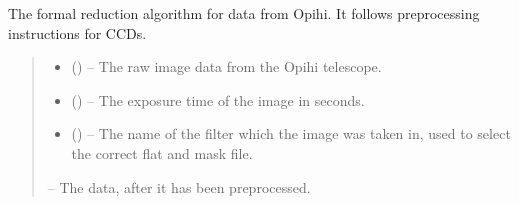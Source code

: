 \documentclass[letterpaper,11pt,english]{sphinxmanual}
\begin{document}
\begin{savenotes}
\begin{fulllineitems}
\begin{savenotes}\begin{fulllineitems}
\label{\detokenize{code/opihiexarata.opihi.preprocess:opihiexarata.opihi.preprocess.OpihiPreprocessSolution.preprocess_data_image}}
\pysigstartsignatures
{}
\pysigstopsignatures
\sphinxAtStartPar
The formal reduction algorithm for data from Opihi. It follows
preprocessing instructions for CCDs.
\begin{quote}\begin{description}
\begin{itemize}
\item {} 
\sphinxAtStartPar
{} () – The raw image data from the Opihi telescope.

\item {} 
\sphinxAtStartPar
{} () – The exposure time of the image in seconds.

\item {} 
\sphinxAtStartPar
{} () – The name of the filter which the image was taken in, used to
select the correct flat and mask file.

\end{itemize}

\sphinxAtStartPar
{} – The data, after it has been preprocessed.


\end{description}
\end{quote}
\end{fulllineitems}
\end{savenotes}
\end{fulllineitems}
\end{savenotes}
\end{document}
